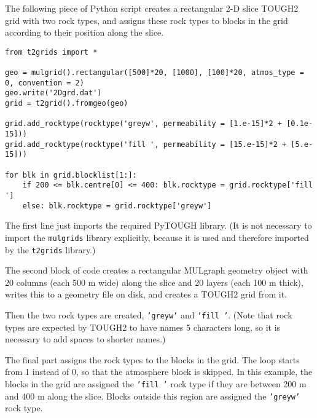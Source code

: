 The following piece of Python script creates a rectangular 2-D slice TOUGH2 grid with two rock types, and assigns these rock types to blocks in the grid according to their position along the slice.

\begin{lstlisting}
from t2grids import *

geo = mulgrid().rectangular([500]*20, [1000], [100]*20, atmos_type = 0, convention = 2)
geo.write('2Dgrd.dat')
grid = t2grid().fromgeo(geo)

grid.add_rocktype(rocktype('greyw', permeability = [1.e-15]*2 + [0.1e-15]))
grid.add_rocktype(rocktype('fill ', permeability = [15.e-15]*2 + [5.e-15]))

for blk in grid.blocklist[1:]:
    if 200 <= blk.centre[0] <= 400: blk.rocktype = grid.rocktype['fill ']
    else: blk.rocktype = grid.rocktype['greyw']
\end{lstlisting}

The first line just imports the required PyTOUGH library.  (It is not necessary to import the \texttt{mulgrids} library explicitly, because it is used and therefore imported by the \texttt{t2grids} library.)

The second block of code creates a rectangular MULgraph geometry object with 20 columns (each 500 m wide) along the slice and 20 layers (each 100 m thick), writes this to a geometry file on disk, and creates a TOUGH2 grid from it.

Then the two rock types are created, \texttt{'greyw'} and \texttt{'fill '}.  (Note that rock types are expected by TOUGH2 to have names 5 characters long, so it is necessary to add spaces to shorter names.)

The final part assigns the rock types to the blocks in the grid.  The loop starts from 1 instead of 0, so that the atmosphere block is skipped.  In this example, the blocks in the grid are assigned the \texttt{'fill '} rock type if they are between 200 m and 400 m along the slice.  Blocks outside this region are assigned the \texttt{'greyw'} rock type.
